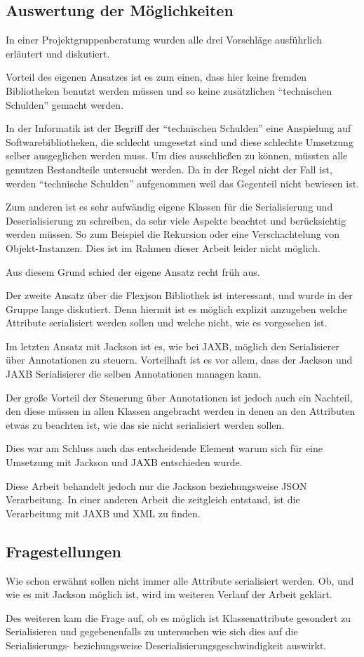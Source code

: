 \subsection{Auswertung der M\"oglichkeiten}
In einer Projektgruppenberatumg wurden alle drei Vorschl\"age ausf\"uhrlich erl\"autert und diskutiert. 

Vorteil des eigenen Ansatzes ist es zum einen, dass hier keine fremden Bibliotheken benutzt werden m\"ussen und so keine zus\"atzlichen "`technischen Schulden"' gemacht werden. 

In der Informatik ist der Begriff der "`technischen Schulden"' eine Anspielung auf Softwarebibliotheken, die schlecht umgesetzt sind und diese schlechte Umsetzung selber ausgeglichen werden muss. Um dies ausschlie\ss{}en zu k\"onnen, m\"ussten alle genutzen Bestandteile untersucht werden. Da in der Regel nicht der Fall ist, werden "`technische Schulden"' aufgenommen weil das Gegenteil nicht bewiesen ist.

Zum anderen ist es sehr aufw\"andig eigene Klassen f\"ur die Serialisierung und Deserialisierung zu schreiben, da sehr viele Aspekte beachtet und ber\"ucksichtig werden m\"ussen. So zum Beispiel die Rekursion oder eine Verschachtelung von Objekt-Instanzen. Dies ist im Rahmen dieser Arbeit leider nicht m\"oglich.

Aus diesem Grund schied der eigene Ansatz recht fr\"uh aus.

Der zweite Ansatz \"uber die Flexjson Bibliothek ist interessant, und wurde in der Gruppe lange diskutiert. Denn hiermit ist es m\"oglich explizit anzugeben welche Attribute serialisiert werden sollen und welche nicht, wie es vorgesehen ist.

Im letzten Ansatz mit Jackson ist es, wie bei \ac{JAXB}, m\"oglich den Serialisierer \"uber Annotationen zu steuern. Vorteilhaft ist es vor allem, dass der Jackson und \ac{JAXB} Serialisierer die selben Annotationen managen kann. 

Der gro\ss{}e Vorteil der Steuerung \"uber Annotationen ist jedoch auch ein Nachteil, den diese m\"ussen in allen Klassen angebracht werden in denen an den Attributen etwas zu beachten ist, wie das sie nicht serialisiert werden sollen.

Dies war am Schluss auch das entscheidende Element warum sich f\"ur eine Umsetzung mit Jackson und \ac{JAXB} entschieden wurde. 

Diese Arbeit behandelt jedoch nur die Jackson beziehungsweise \ac{JSON} Verarbeitung. In einer anderen Arbeit die zeitgleich entstand, ist die Verarbeitung mit \ac{JAXB} und XML zu finden. \cite{Wal14} 

\subsection{Fragestellungen}
Wie schon erw\"ahnt sollen nicht immer alle Attribute serialisiert werden. Ob, und wie es mit Jackson m\"oglich ist, wird im weiteren Verlauf der Arbeit gekl\"art. 

Des weiteren kam die Frage auf, ob es m\"oglich ist Klassenattribute gesondert zu Serialisieren und gegebenenfalls zu untersuchen wie sich dies auf die Serialisierungs- beziehungsweise Deserialisierungsgeschwindigkeit auswirkt.